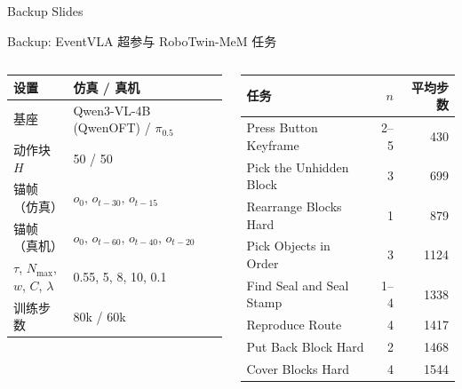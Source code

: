 \documentclass[aspectratio=169,10pt]{beamer}
\begin{document}
\appendix
\begin{frame}{Backup Slides}\end{frame}

\begin{frame}{Backup: EventVLA 超参与 RoboTwin-MeM 任务}
\begin{columns}[T]
\scriptsize
\begin{tabular}{@{}ll@{}}
\toprule
设置 & 仿真 / 真机 \\
\midrule
基座 & Qwen3-VL-4B (QwenOFT) / $\pi_{0.5}$ \\
动作块 $H$ & 50 / 50 \\
锚帧（仿真） & $o_0,\,o_{t-30},\,o_{t-15}$ \\
锚帧（真机） & $o_0,\,o_{t-60},\,o_{t-40},\,o_{t-20}$ \\
$\tau$, $N_{\max}$, $w$, $C$, $\lambda$ & 0.55, 5, 8, 10, 0.1 \\
训练步数 & 80k / 60k \\
\bottomrule
\end{tabular}
\small
\begin{tabular}{@{}lrr@{}}
\toprule
任务 & $n$ & 平均步数 \\
\midrule
Press Button Keyframe & 2--5 & 430 \\
Pick the Unhidden Block & 3 & 699 \\
Rearrange Blocks Hard & 1 & 879 \\
Pick Objects in Order & 3 & 1124 \\
Find Seal and Seal Stamp & 1--4 & 1338 \\
Reproduce Route & 4 & 1417 \\
Put Back Block Hard & 2 & 1468 \\
Cover Blocks Hard & 4 & 1544 \\
\bottomrule
\end{tabular}
\end{columns}
\end{frame}
\end{document}
